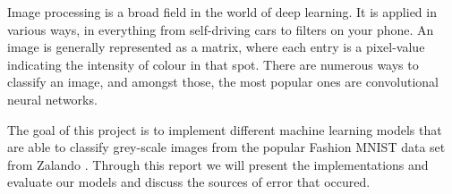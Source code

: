 \documentclass[../main.tex]{subfiles}
\begin{document}
Image processing is a broad field in the world of deep learning. 
It is applied in various ways, in everything from self-driving 
cars to filters on your phone.
An image is generally represented as a matrix, where each entry is 
a pixel-value indicating the intensity of colour in that spot. 
There are numerous ways to classify an image, and amongst those, 
the most popular ones are convolutional neural networks. 

The goal of this project is to implement different machine 
learning models that are able to classify grey-scale images from 
the popular Fashion MNIST data set from Zalando 
\autocite{xiao2017/online}. Through this report we will present 
the implementations and evaluate our models and discuss the 
sources of error that occured. 
\end{document}
